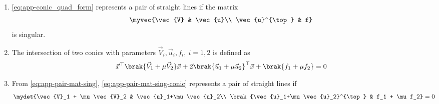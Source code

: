 \begin{enumerate}[label=\thesubsection.\arabic*.,ref=\thesubsection.\theenumi]
  \item
	  \label{them:pair-mat-sing}
\eqref{eq:app-conic_quad_form} represents a pair of straight lines if 
the matrix 
  \begin{align} 
	  \myvec{\vec{V} & \vec{u}\\ \vec{u}^{\top} & f}  
	  \label{eq:app-pair-mat-sing}
  \end{align} 
  is singular.
\item The intersection of two conics 
with parameters $\vec{V}_i, \vec{u}_i, f_i,\ i = 1,2$
	is defined
as
\begin{align}
	\vec{x}^{\top}\brak{\vec{V}_1 + \mu\vec{V}_2}\vec{x}+2 \brak{\vec{u}_1+\mu \vec{u}_2}^{\top} \vec{x} 
	+ \brak{f_1+\mu f_2}= 0
	  \label{eq:app-pair-mat-sing-conic}
    \end{align}
	  
	  
\item From \eqref{eq:app-pair-mat-sing}, \eqref{eq:app-pair-mat-sing-conic} represents a pair of straight lines if
\begin{align}
	  \label{eq:app-pair-mat-sing-conic-det}
\mydet{\vec{V}_1 + \mu\vec{V}_2 & \vec{u}_1+\mu \vec{u}_2\\ \brak{\vec{u}_1+\mu \vec{u}_2}^{\top} & f_1 + \mu f_2} &= 0
\end{align}
\end{enumerate}
